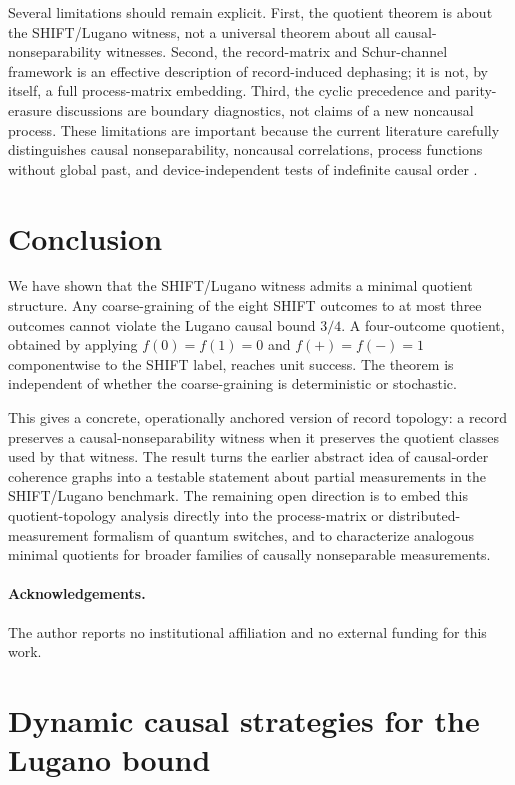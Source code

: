 \documentclass[11pt,a4paper]{article}
\begin{document}
Several limitations should remain explicit.  First, the quotient theorem is about the SHIFT/Lugano witness, not a universal theorem about all causal-nonseparability witnesses.  Second, the record-matrix and Schur-channel framework is an effective description of record-induced dephasing; it is not, by itself, a full process-matrix embedding.  Third, the cyclic precedence and parity-erasure discussions are boundary diagnostics, not claims of a new noncausal process.  These limitations are important because the current literature carefully distinguishes causal nonseparability, noncausal correlations, process functions without global past, and device-independent tests of indefinite causal order \cite{Oreshkov2012,Araujo2015,KunjwalBaumeler2023,Steffinlongo2025,LiuOreshkov2025,Valibouse2026}.

\section{Conclusion}

We have shown that the SHIFT/Lugano witness admits a minimal quotient structure.  Any coarse-graining of the eight SHIFT outcomes to at most three outcomes cannot violate the Lugano causal bound $3/4$.  A four-outcome quotient, obtained by applying $f(0)=f(1)=0$ and $f(+)=f(-)=1$ componentwise to the SHIFT label, reaches unit success.  The theorem is independent of whether the coarse-graining is deterministic or stochastic.

This gives a concrete, operationally anchored version of record topology: a record preserves a causal-nonseparability witness when it preserves the quotient classes used by that witness.  The result turns the earlier abstract idea of causal-order coherence graphs into a testable statement about partial measurements in the SHIFT/Lugano benchmark.  The remaining open direction is to embed this quotient-topology analysis directly into the process-matrix or distributed-measurement formalism of quantum switches, and to characterize analogous minimal quotients for broader families of causally nonseparable measurements.

\paragraph{Acknowledgements.} The author reports no institutional affiliation and no external funding for this work.


\appendix

\section{Dynamic causal strategies for the Lugano bound}
\label{app:causal-bound}
\end{document}
